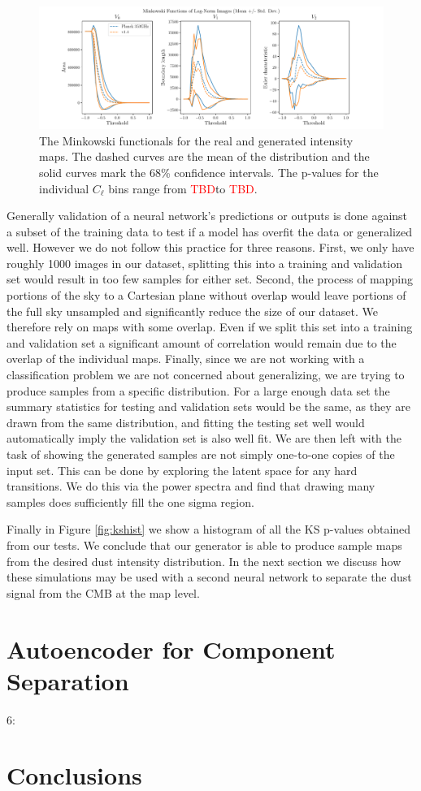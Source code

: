 \documentclass[twocolumn]{aastex62}
\def\tbd{\textcolor{red}{TBD}}
\begin{document}
\begin{figure}[!tbh]
\includegraphics[width = \textwidth]{MinkowskiFunctionals.pdf}
\caption{The Minkowski functionals for the real and generated intensity maps. The dashed curves are the mean of the distribution and the solid curves mark the 68\% confidence intervals. The p-values for the individual $C_{\ell}$ bins range from \tbd to \tbd.}
\label{fig:mink}
\end{figure}

Generally validation of a neural network's predictions or outputs is done against a subset of the training data to test if a model has overfit the data or generalized well. However we do not follow this practice for three reasons. First, we only have roughly 1000 images in our dataset, splitting this into a training and validation set would result in too few samples for either set. Second, the process of mapping portions of the sky to a Cartesian plane without overlap would leave portions of the full sky unsampled and significantly reduce the size of our dataset. We therefore rely on maps with some overlap. Even if we split this set into a training and validation set a significant amount of correlation would remain due to the overlap of the individual maps. Finally, since we are not working with a classification problem we are not concerned about generalizing, we are trying to produce samples from a specific distribution. For a large enough data set the summary statistics for testing and validation sets would be the same, as they are drawn from the same distribution, and fitting the testing set well would automatically imply the validation set is also well fit. We are then left with the task of showing the generated samples are not simply one-to-one copies of the input set. This can be done by exploring the latent space for any hard transitions. We do this via the power spectra and find that drawing many samples does sufficiently fill the one sigma region.

 Finally in Figure \ref{fig:kshist} we show a histogram of all the KS p-values obtained from our tests. We conclude that our generator is able to produce sample maps from the desired dust intensity distribution. In the next section we discuss how these simulations may be used with a second neural network to separate the dust signal from the CMB at the map level.
 
 



\section{Autoencoder for Component Separation}

6:

\section{Conclusions}


\end{document}
